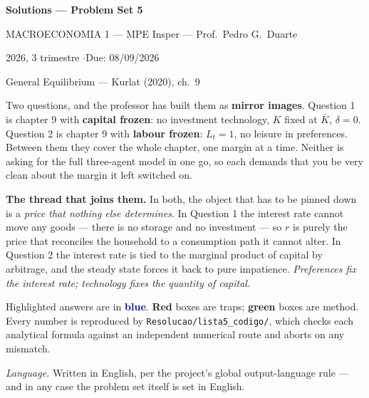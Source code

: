 \documentclass[11pt, a4paper]{article}
\newcommand{\resp}[1]{%
  \ifmmode {\color{darkblue}#1}\else\textcolor{darkblue}{\textbf{#1}}\fi}
\newcommand{\Kb}{\bar K}
\begin{document}
\begin{center}
{\LARGE\bfseries\color{darkblue} Solutions --- Problem Set 5\par}
\vspace{4pt}
{\large MACROECONOMIA 1 --- MPE Insper --- Prof.\ Pedro G.\ Duarte\par}
\vspace{2pt}
{\normalsize 2026, 3\textordmasculine{} trimestre \quad$\cdot$\quad Due: 08/09/2026\par}
\vspace{2pt}
{\small General Equilibrium --- Kurlat (2020), ch.\ 9\par}
\end{center}
\vspace{6pt}

\begin{tcolorbox}[theorybox, title={How to read this document}]
\small
Two questions, and the professor has built them as \textbf{mirror images}. Question 1 is
chapter 9 with \textbf{capital frozen}: no investment technology, $K$ fixed at $\Kb$,
$\delta=0$. Question 2 is chapter 9 with \textbf{labour frozen}: $L_t=1$, no leisure in
preferences. Between them they cover the whole chapter, one margin at a time. Neither is
asking for the full three-agent model in one go, so each demands that you be very clean
about the margin it left switched on.

\smallskip
\textbf{The thread that joins them.} In both, the object that has to be pinned down is a
\emph{price that nothing else determines}. In Question 1 the interest rate cannot move any
goods --- there is no storage and no investment --- so $r$ is purely the price that
reconciles the household to a consumption path it cannot alter. In Question 2 the interest
rate is tied to the marginal product of capital by arbitrage, and the steady state forces
it back to pure impatience. \emph{Preferences fix the interest rate; technology fixes the
quantity of capital.}

\smallskip
Highlighted answers are in \resp{blue}. \textcolor{trapcolor}{\textbf{Red}} boxes are
traps; \textcolor{plancolor}{\textbf{green}} boxes are method. Every number is reproduced
by \texttt{Resolucao/lista5\_codigo/}, which checks each analytical formula against an
independent numerical route and aborts on any mismatch.

\smallskip
\emph{Language.} Written in English, per the project's global output-language rule --- and
in any case the problem set itself is set in English.
\end{tcolorbox}
\end{document}
